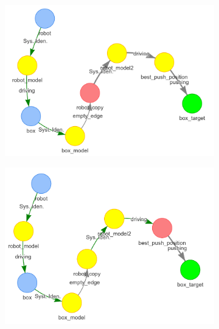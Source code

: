 \begin{figure}[H]
    \begin{subfigure}{.3\textwidth}
    \centering
    \includegraphics[width=1\textwidth]{figures/connecting_nodes/robot_push/robot_push_7}
    \caption{}\label{subfig:robot_push_7}
    \end{subfigure}
    \begin{subfigure}{.3\textwidth}
    \centering
    \includegraphics[width=1.05\textwidth]{figures/connecting_nodes/robot_push/robot_push_8}
    \caption{}\label{subfig:robot_push_8}
    \end{subfigure}
    \begin{subfigure}{.3\textwidth}
    \centering

\end{subfigure}
\end{figure}

